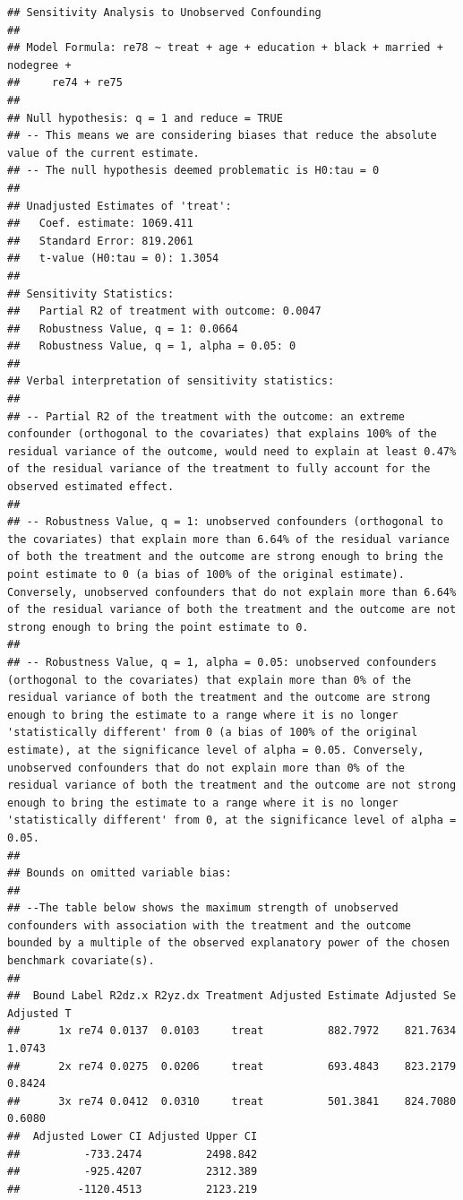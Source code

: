 \documentclass[
]{article}
\begin{document}
\begin{verbatim}
## Sensitivity Analysis to Unobserved Confounding
## 
## Model Formula: re78 ~ treat + age + education + black + married + nodegree + 
##     re74 + re75
## 
## Null hypothesis: q = 1 and reduce = TRUE 
## -- This means we are considering biases that reduce the absolute value of the current estimate.
## -- The null hypothesis deemed problematic is H0:tau = 0 
## 
## Unadjusted Estimates of 'treat': 
##   Coef. estimate: 1069.411 
##   Standard Error: 819.2061 
##   t-value (H0:tau = 0): 1.3054 
## 
## Sensitivity Statistics:
##   Partial R2 of treatment with outcome: 0.0047 
##   Robustness Value, q = 1: 0.0664 
##   Robustness Value, q = 1, alpha = 0.05: 0 
## 
## Verbal interpretation of sensitivity statistics:
## 
## -- Partial R2 of the treatment with the outcome: an extreme confounder (orthogonal to the covariates) that explains 100% of the residual variance of the outcome, would need to explain at least 0.47% of the residual variance of the treatment to fully account for the observed estimated effect.
## 
## -- Robustness Value, q = 1: unobserved confounders (orthogonal to the covariates) that explain more than 6.64% of the residual variance of both the treatment and the outcome are strong enough to bring the point estimate to 0 (a bias of 100% of the original estimate). Conversely, unobserved confounders that do not explain more than 6.64% of the residual variance of both the treatment and the outcome are not strong enough to bring the point estimate to 0.
## 
## -- Robustness Value, q = 1, alpha = 0.05: unobserved confounders (orthogonal to the covariates) that explain more than 0% of the residual variance of both the treatment and the outcome are strong enough to bring the estimate to a range where it is no longer 'statistically different' from 0 (a bias of 100% of the original estimate), at the significance level of alpha = 0.05. Conversely, unobserved confounders that do not explain more than 0% of the residual variance of both the treatment and the outcome are not strong enough to bring the estimate to a range where it is no longer 'statistically different' from 0, at the significance level of alpha = 0.05.
## 
## Bounds on omitted variable bias:
## 
## --The table below shows the maximum strength of unobserved confounders with association with the treatment and the outcome bounded by a multiple of the observed explanatory power of the chosen benchmark covariate(s).
## 
##  Bound Label R2dz.x R2yz.dx Treatment Adjusted Estimate Adjusted Se Adjusted T
##      1x re74 0.0137  0.0103     treat          882.7972    821.7634     1.0743
##      2x re74 0.0275  0.0206     treat          693.4843    823.2179     0.8424
##      3x re74 0.0412  0.0310     treat          501.3841    824.7080     0.6080
##  Adjusted Lower CI Adjusted Upper CI
##          -733.2474          2498.842
##          -925.4207          2312.389
##         -1120.4513          2123.219
\end{verbatim}
\end{document}
